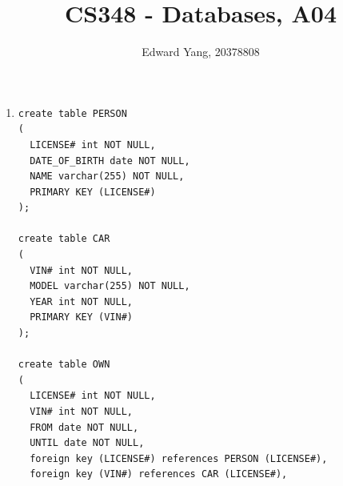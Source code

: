 \documentclass[11pt, oneside]{article}   	%
\title{CS348 - Databases, A04}
\author{Edward Yang, 20378808}
\begin{document}
\maketitle
\begin{enumerate}
\item 
\begin{verbatim}
create table PERSON
(
  LICENSE# int NOT NULL,
  DATE_OF_BIRTH date NOT NULL,
  NAME varchar(255) NOT NULL,
  PRIMARY KEY (LICENSE#)
);

create table CAR
(
  VIN# int NOT NULL,
  MODEL varchar(255) NOT NULL,
  YEAR int NOT NULL,
  PRIMARY KEY (VIN#)
);

create table OWN
(
  LICENSE# int NOT NULL,
  VIN# int NOT NULL,
  FROM date NOT NULL,
  UNTIL date NOT NULL,
  foreign key (LICENSE#) references PERSON (LICENSE#),
  foreign key (VIN#) references CAR (LICENSE#),


\end{verbatim}
\end{enumerate}
\end{document}

